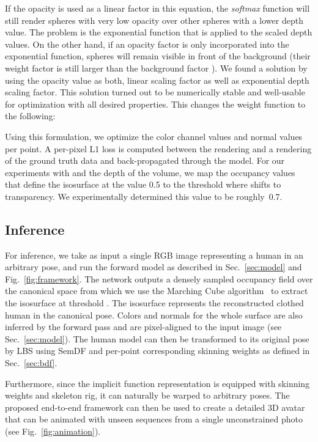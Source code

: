 \documentclass[10pt,twocolumn,letterpaper]{article}
\newcommand{\beforesubsection}{\vspace{0mm}}
\newcommand{\aftersubsection}{\vspace{0mm}}
\begin{document}
If the opacity is used as a linear factor in this equation, the \textit{softmax} function will still render spheres with very low opacity over other spheres with a lower depth value. The problem is the exponential function that is applied to the scaled depth values. On the other hand, if an opacity factor is only incorporated into the exponential function, spheres will remain visible in front of the background (their weight factor is still larger than the background factor ). We found a solution by using the opacity value as both, linear scaling factor as well as exponential depth scaling factor. This solution turned out to be numerically stable and well-usable for optimization with all desired properties. This changes the weight function to the following:


Using this formulation, we optimize the color channel values  and normal values  per point. A per-pixel L1 loss is computed between the rendering and a rendering of the ground truth data and back-propagated through the model. For our experiments with  and the depth of the volume, we map the occupancy values that define the isosurface at the value \num{0.5} to the threshold where  shifts to transparency. We experimentally determined this value to be roughly~\num{0.7}.

\beforesubsection
\subsection{Inference}
\aftersubsection

For inference, we take as input a single RGB image representing a human in an arbitrary pose, and run the forward model as described
in Sec.~\ref{sec:model} and Fig.~\ref{fig:framework}.
The network outputs a densely sampled occupancy field over the canonical space from which we use the Marching Cube algorithm~\cite{MarchCube87} to extract the isosurface at threshold .
The isosurface represents the reconstructed clothed human in the canonical pose.
Colors and normals for the whole surface are also inferred by the forward pass and are pixel-aligned to the input image (see Sec.~\ref{sec:model}).
The human model can then be transformed to its original pose  by LBS using SemDF and per-point corresponding skinning weights  as defined in Sec.~\ref{sec:bdf}.

Furthermore, since the implicit function representation is equipped with skinning weights and skeleton rig, it can naturally be warped to arbitrary poses.
The proposed end-to-end framework can then be used to create a detailed 3D avatar that can be animated with unseen sequences from a single unconstrained photo (see Fig.~\ref{fig:animation}).
\end{document}
